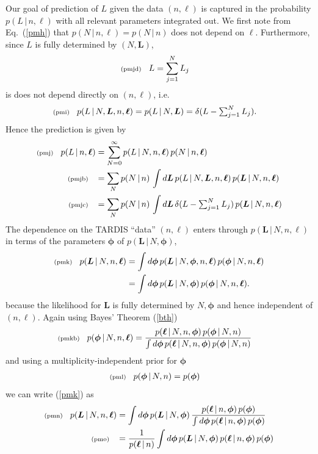 \documentclass[11pt]{article}
\newcommand{\fred}[1]{\todo[inline]{#1}} %
\newcommand{\checked}[1]{\todo[color=green,noline]{\checkmark}} %
\newcommand{\lleq}[1]{\label{#1} }
\renewcommand{\lleq}[1]{\label{#1} {\scriptstyle {\rm (#1)}} \hspace*{2ex} }
\newcommand{\cond}{\,|\,}
\newcommand{\bml}{{\bm{\ell}}}
\newcommand{\bmL}{{\bm{L}}}
\newcommand{\bmphi}{{\bm{\phi}}}
\begin{document}
Our goal of prediction of $L$ given the data $(n,\bml)$ is captured in
the probability $p(L\cond n,\bml)$ with all relevant parameters
integrated out. We first note from Eq.~(\ref{pmh}) that $p(N\cond
n,\bml) = p(N\cond n)$ does not depend on $\bml$. Furthermore, since
$L$ is fully determined by $(N,\bmL)$,
\begin{align}
  \lleq{pmjd}
  L &= \sum_{j=1}^N L_j
\end{align}
is does not depend directly on $(n,\bml)$, i.e.\
\begin{align}
  \lleq{pmi}
  p(L\cond N,\bmL,n,\bml)
  = p(L\cond N,\bmL)
  &= \delta(L - \textstyle\sum_{j=1}^N L_j).
\end{align}
\checked{}
Hence the prediction is given by
\begin{align}
  \lleq{pmj}
  p(L\cond n,\bml)
  &= \sum_{N=0}^\infty p(L\cond N,n,\bml)\,p(N\cond n,\bml) \\
  \lleq{pmjb}
  &= \sum_N p(N\cond n)\,\int d\bmL\, p(L\cond N,\bmL,n,\bml)\, p(\bmL\cond N,n,\bml)
  \\
  \lleq{pmjc}
  &= \sum_N p(N\cond n)\,\int d\bmL\,\delta(L - \textstyle\sum_{j=1}^N L_j)
  \, p(\bmL\cond N,n,\bml)
\end{align}
\checked{}
The dependence on the TARDIS ``data'' $(n,\bml)$ enters through
$p(\bmL\cond N,n,\bml)$ in terms of the parameters $\bmphi$ of
$p(\bmL\cond N,\bmphi)$,
\begin{align}
  \lleq{pmk}
  p(\bmL\cond N,n,\bml)
  &= \int d\bmphi\, p(\bmL\cond N,\bmphi,n,\bml)\,p(\bmphi\cond N,n,\bml) \\
  &= \int d\bmphi\, p(\bmL\cond N,\bmphi)\,p(\bmphi\cond N,n,\bml).
\end{align}
because the likelihood for $\bmL$ is fully determined by $N,\bmphi$
and hence independent of $(n,\bml)$.
%
Again using Bayes' Theorem (\ref{bth})
\begin{align}
  \lleq{pmkb}
  p(\bmphi\cond N,n,\bml) &=
  \frac{p(\bml\cond N,n,\bmphi)\,p(\bmphi\cond N,n)} %
  {\int d\bmphi\,p(\bml\cond N,n,\bmphi)\,p(\bmphi\cond N,n)} %
\end{align}
\fred{$p(\bmphi\cond N,n,\bml) = p(\bmphi\cond n,\bml)$ }
and using a multiplicity-independent prior for $\bmphi$
\begin{align}
  \lleq{pml}
  p(\bmphi\cond N,n) &= p(\bmphi)
\end{align}
we can write (\ref{pmk}) as
\begin{align}
  \lleq{pmn}
  p(\bmL\cond N,n,\bml)
  &= \int d\bmphi\, p(\bmL\cond N,\bmphi)\, %
  \frac{p(\bml\cond n,\bmphi)\,p(\bmphi)} %
  {\int d\bmphi\,p(\bml\cond n,\bmphi)\,p(\bmphi)} \\
  \lleq{pmo}
  &= \frac{1}  {p(\bml\cond n)} %
  \int d\bmphi\, p(\bmL\cond N,\bmphi)\, %
  p(\bml\cond n,\bmphi)\,p(\bmphi)
\end{align}
\end{document}
